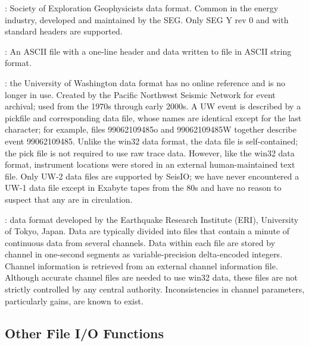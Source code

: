 \documentclass[letterpaper,11pt,english]{sphinxmanual}
\begin{document}
: Society of Exploration Geophysicists
data format. Common in the energy industry, developed and maintained by the SEG.
Only SEG Y rev 0 and 
with standard headers are supported.

: An ASCII file with a one-line header and data written to file in
ASCII string format.

: the University of Washington data format has no online reference and is
no longer in use. Created by the Pacific Northwest Seismic Network for event
archival; used from the 1970s through early 2000s. A UW event is described by a
pickfile and corresponding data file, whose names are identical except for the
last character; for example, files 99062109485o and 99062109485W together
describe event 99062109485. Unlike the win32 data format, the data file is
self-contained; the pick file is not required to use raw trace data. However,
like the win32 data format, instrument locations were stored in an external
human-maintained text file. Only UW-2 data files are supported by SeisIO; we
have never encountered a UW-1 data file except in Exabyte tapes from the 80s
and have no reason to suspect that any are in circulation.

: data format developed
by the Earthquake Research Institute (ERI), University of Tokyo, Japan. Data
are typically divided into files that contain a minute of continuous
data from several channels. Data within each file are stored by channel in
one-second segments as variable-precision delta-encoded integers. Channel
information is retrieved from an external channel information file. Although
accurate channel files are needed to use win32 data, these files are not
strictly controlled by any central authority. Inconsistencies in channel
parameters, particularly gains, are known to exist.


\subsection{Other File I/O Functions}
\label{\detokenize{src/Formats/timeseries:other-file-i-o-functions}}

\begin{fulllineitems}
\label{\detokenize{src/Formats/timeseries:rseis}}
\end{fulllineitems}
\end{document}
